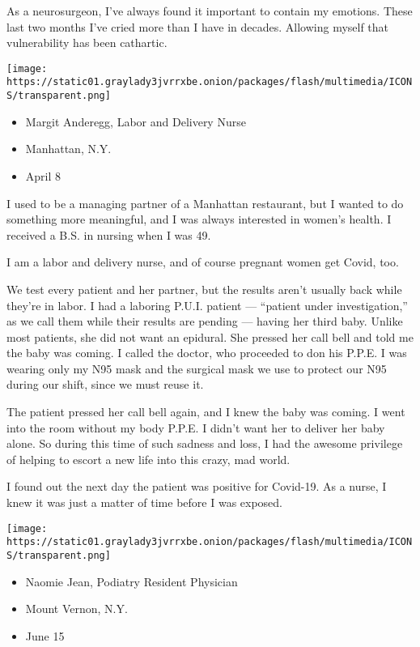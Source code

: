 As a neurosurgeon, I've always found it important to contain my
emotions. These last two months I've cried more than I have in decades.
Allowing myself that vulnerability has been cathartic.

\texttt{[image: https://static01.graylady3jvrrxbe.onion/packages/flash/multimedia/ICONS/transparent.png]}

\begin{itemize}
\tightlist
\item
  Margit Anderegg, Labor and Delivery Nurse
\item
  Manhattan, N.Y.
\item
  April 8
\end{itemize}

I used to be a managing partner of a Manhattan restaurant, but I wanted
to do something more meaningful, and I was always interested in women's
health. I received a B.S. in nursing when I was 49.

I am a labor and delivery nurse, and of course pregnant women get Covid,
too.

We test every patient and her partner, but the results aren't usually
back while they're in labor. I had a laboring P.U.I. patient ---
``patient under investigation,'' as we call them while their results are
pending --- having her third baby. Unlike most patients, she did not
want an epidural. She pressed her call bell and told me the baby was
coming. I called the doctor, who proceeded to don his P.P.E. I was
wearing only my N95 mask and the surgical mask we use to protect our N95
during our shift, since we must reuse it.

The patient pressed her call bell again, and I knew the baby was coming.
I went into the room without my body P.P.E. I didn't want her to deliver
her baby alone. So during this time of such sadness and loss, I had the
awesome privilege of helping to escort a new life into this crazy, mad
world.

I found out the next day the patient was positive for Covid-19. As a
nurse, I knew it was just a matter of time before I was exposed.

\texttt{[image: https://static01.graylady3jvrrxbe.onion/packages/flash/multimedia/ICONS/transparent.png]}

\begin{itemize}
\tightlist
\item
  Naomie Jean, Podiatry Resident Physician
\item
  Mount Vernon, N.Y.
\item
  June 15
\end{itemize}

